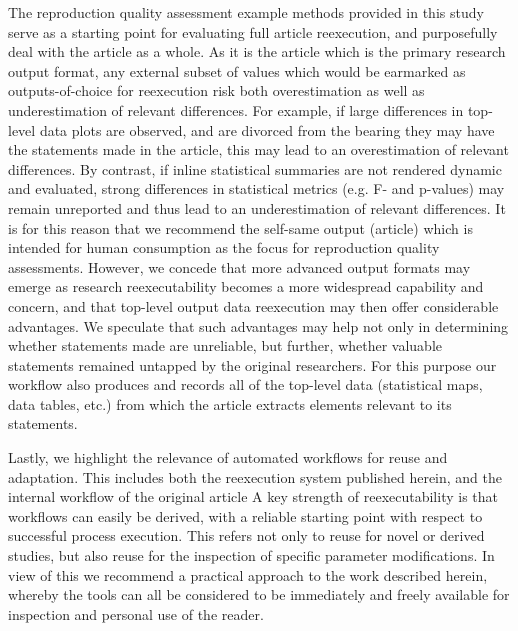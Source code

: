 The reproduction quality assessment example methods provided in this study serve as a starting point for evaluating full article reexecution, and purposefully deal with the article as a whole.
As it is the article which is the primary research output format, any external subset of values which would be earmarked as outputs-of-choice for reexecution risk both overestimation as well as underestimation of relevant differences.
For example, if large differences in top-level data plots are observed, and are divorced from the bearing they may have the statements made in the article, this may lead to an overestimation of relevant differences.
By contrast, if inline statistical summaries are not rendered dynamic and evaluated, strong differences in statistical metrics (e.g. F- and p-values) may remain unreported and thus lead to an underestimation of relevant differences.
It is for this reason that we recommend the self-same output (article) which is intended for human consumption as the focus for reproduction quality assessments.
However, we concede that more advanced output formats may emerge as research reexecutability becomes a more widespread capability and concern, and that top-level output data reexecution may then offer considerable advantages.
We speculate that such advantages may help not only in determining whether statements made are unreliable, but further, whether valuable statements remained untapped by the original researchers.
For this purpose our workflow also produces and records all of the top-level data (statistical maps, data tables, etc.) from which the article extracts elements relevant to its statements.

Lastly, we highlight the relevance of automated workflows for reuse and adaptation.
This includes both the reexecution system published herein, and the internal workflow of the original article
A key strength of reexecutability is that workflows can easily be derived, with a reliable starting point with respect to successful process execution.
This refers not only to reuse for novel or derived studies, but also reuse for the inspection of specific parameter modifications.
In view of this we recommend a practical approach to the work described herein, whereby the tools can all be considered to be immediately and freely available for inspection and personal use of the reader.






